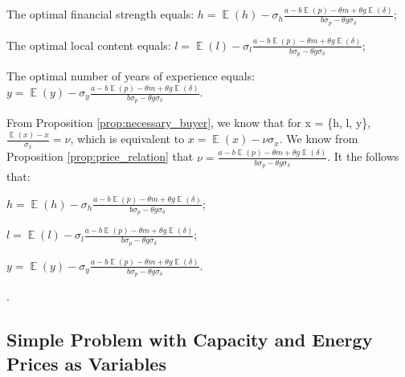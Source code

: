 \documentclass[informs]{informs3}
\begin{document}
\begin{proposition}\label{prop:optimal_l_h_y}

	
	The optimal financial strength equals: 	
	$h =\mathop{\mathbb{E}}\left(h\right)-  \sigma_{h} \frac{a-b \mathop{\mathbb{E}}\left(p\right)-\theta m+\theta g \mathop{\mathbb{E}}\left(\delta\right)}{b\sigma_{p}-\theta g\sigma_{\delta}}$;
	
	The optimal local content equals: 	
	$l =\mathop{\mathbb{E}}\left(l\right)-  \sigma_{l} \frac{a-b \mathop{\mathbb{E}}\left(p\right)-\theta m+\theta g \mathop{\mathbb{E}}\left(\delta\right)}{b\sigma_{p}-\theta g\sigma_{\delta}}$;

	The optimal number of years of experience equals:	
	$y =\mathop{\mathbb{E}}\left(y\right)-  \sigma_{y} \frac{a-b \mathop{\mathbb{E}}\left(p\right)-\theta m+\theta g \mathop{\mathbb{E}}\left(\delta\right)}{b\sigma_{p}-\theta g\sigma_{\delta}}$.
	
	
\end{proposition}
%
From Proposition \ref{prop:necessary_buyer}, we know that for x = \{h, l, y\},  $\frac{\mathop{\mathbb{E}}\left(x\right)-x}{\sigma_{x}} = \nu$,  which is equivalent to $x =\mathop{\mathbb{E}}\left(x\right)- \nu \sigma_{x}$. We know from Proposition \ref{prop:price_relation} that $\nu =\frac{a-b \mathop{\mathbb{E}}\left(p\right)-\theta m+\theta g \mathop{\mathbb{E}}\left(\delta\right)}{b\sigma_{p}-\theta g\sigma_{\delta}}$. It the follows that:


$h =\mathop{\mathbb{E}}\left(h\right)-  \sigma_{h} \frac{a-b \mathop{\mathbb{E}}\left(p\right)-\theta m+\theta g \mathop{\mathbb{E}}\left(\delta\right)}{b\sigma_{p}-\theta g\sigma_{\delta}}$;


$l =\mathop{\mathbb{E}}\left(l\right)-  \sigma_{l} \frac{a-b \mathop{\mathbb{E}}\left(p\right)-\theta m+\theta g \mathop{\mathbb{E}}\left(\delta\right)}{b\sigma_{p}-\theta g\sigma_{\delta}}$;

$y =\mathop{\mathbb{E}}\left(y\right)-  \sigma_{y} \frac{a-b \mathop{\mathbb{E}}\left(p\right)-\theta m+\theta g \mathop{\mathbb{E}}\left(\delta\right)}{b\sigma_{p}-\theta g\sigma_{\delta}}$.


.\Halmos
\endproof




\subsection{Simple Problem with Capacity and Energy Prices as Variables}
\end{document}

